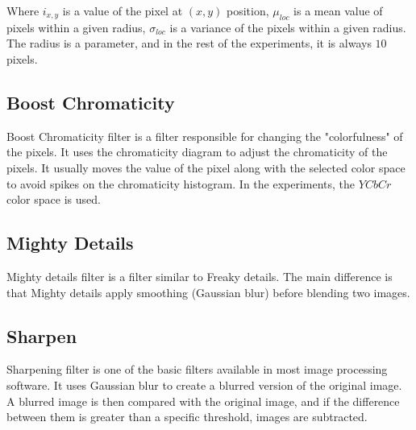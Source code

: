 Where $i_{x,y}$ is a value of the pixel at $(x,y)$ position, $\mu_{loc}$ is a mean value of pixels within a given radius, $\sigma_{loc}$ is a variance of the pixels within a given radius. The radius is a parameter, and in the rest of the experiments, it is always $10$ pixels.

\subsection*{Boost Chromaticity}

Boost Chromaticity filter \cite{boost_chroma} is a filter responsible for changing the "colorfulness" of the pixels. It uses the chromaticity diagram to adjust the chromaticity of the pixels. It usually moves the value of the pixel along with the selected color space to avoid spikes on the chromaticity histogram. In the experiments, the $YCbCr$ color space is used.

\subsection*{Mighty Details}

Mighty details filter \cite{mighty_details} is a filter similar to Freaky details. The main difference is that Mighty details apply smoothing (Gaussian blur) before blending two images.

\subsection*{Sharpen}

Sharpening filter \cite{sharpen} is one of the basic filters available in most image processing software. It uses Gaussian blur to create a blurred version of the original image. A blurred image is then compared with the original image, and if the difference between them is greater than a specific threshold, images are subtracted.